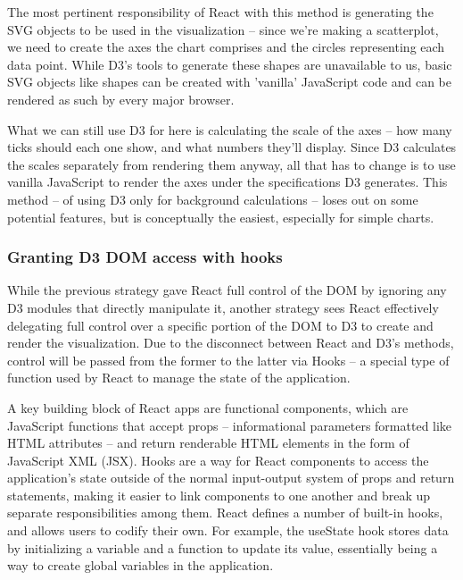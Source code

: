 The most pertinent responsibility of React with this method is generating the SVG objects to be used in the visualization -- since we're making a scatterplot, we need to create the axes the chart comprises and the circles representing each data point. While D3's tools to generate these shapes are unavailable to us, basic SVG objects like shapes can be created with 'vanilla' JavaScript code and can be rendered as such by every major browser.

What we can still use D3 for here is calculating the scale of the axes -- how many ticks should each one show, and what numbers they'll display. Since D3 calculates the scales separately from rendering them anyway, all that has to change is to use vanilla JavaScript to render the axes under the specifications D3 generates. This method -- of using D3 only for background calculations -- loses out on some potential features, but is conceptually the easiest, especially for simple charts.

\subsubsection{Granting D3 DOM access with hooks}\label{hooks}

While the previous strategy gave React full control of the DOM by ignoring any D3 modules that directly manipulate it, another strategy sees React effectively delegating full control over a specific portion of the DOM to D3 to create and render the visualization. Due to the disconnect between React and D3's methods, control will be passed from the former to the latter via Hooks -- a special type of function used by React to manage the state of the application.

A key building block of React apps are functional components, which are JavaScript functions that accept props -- informational parameters formatted like HTML attributes -- and return renderable HTML elements in the form of JavaScript XML (JSX). Hooks are a way for React components to access the application's state outside of the normal input-output system of props and return statements, making it easier to link components to one another and break up separate responsibilities among them. React defines a number of built-in hooks, and allows users to codify their own. For example, the useState hook stores data by initializing a variable and a function to update its value, essentially being a way to create global variables in the application.

